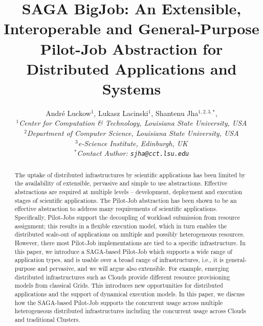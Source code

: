 \documentclass[conference,final]{IEEEtran}
\title{SAGA BigJob: An Extensible, Interoperable and General-Purpose
  Pilot-Job Abstraction for Distributed Applications and Systems}
\author{
Andr\'e Luckow$^{1}$, Lukasz Lacinski$^{1}$,   Shantenu Jha$^{1,2,3,*}$,\\
  \small{\emph{$^{1}$Center for Computation \& Technology, Louisiana State University, USA}}\\
  \small{\emph{$^{2}$Department of Computer Science, Louisiana State University, USA}}\\
  \small{\emph{$^{3}$e-Science Institute, Edinburgh, UK}}\\
  \small{\emph{$^{*}$Contact Author: \texttt{sjha@cct.lsu.edu}}}\\
}
\newcommand{\up}{\vspace*{-1em}}
\newcommand{\alnote}[1]{ {\textcolor{blue} { ***AL: #1 }}}
\newcommand{\jhanote}[1]{ {\textcolor{red} { ***SJ: #1 }}}
\newcommand{\alnote}[1]{}
\newcommand{\jhanote}[1]{}
\begin{document}
 

\maketitle    


\begin{abstract}
  The uptake of distributed infrastructures by scientific applications
  has been limited by the availability of extensible, pervasive and
  simple to use abstractions. Effective abstractions are required at
  multiple levels -- development, deployment and execution stages of
  scientific applications. The Pilot-Job abstraction has been shown to
  be an effective abstraction to address many requirements of
  scientific applications.  Specifically, Pilot-Jobs support the
  decoupling of workload submission from resource assignment; this
  results in a flexible execution model, which in turn enables the
  distributed scale-out of applications on multiple and possibly
  heterogeneous resources.  However, there most Pilot-Job
  implementations are tied to a specific infrastructure.  In this
  paper, we introduce a SAGA-based Pilot-Job which supports a wide
  range of application types, and is usable over a broad range of
  infrastructures, i.e., it is general-purpose and pervasive, and we
  will argue also extensible. For example, emerging distributed
  infrastructures such as Clouds provide different resource
  provisioning models from classical Grids. This introduces new
  opportunities for distributed applications and the support of
  dynamical execution models. In this paper, we discuss how the
  SAGA-based Pilot-Job %
  supports the concurrent usage across multiple heterogeneous
  distributed infrastructures including the concurrent usage across
  Clouds and traditional Clusters.  %
\end{abstract}



\end{document}
